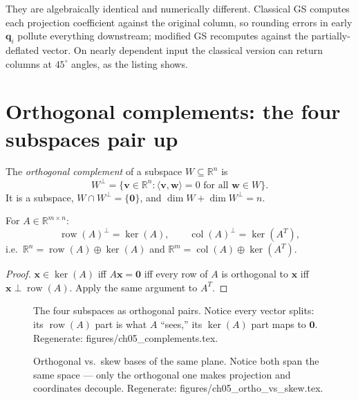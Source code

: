 \begin{tripwire}
They are algebraically identical and numerically different. Classical GS
computes each projection coefficient against the original column, so
rounding errors in early $\mathbf q_i$ pollute everything downstream;
modified GS recomputes against the partially-deflated vector. On nearly
dependent input the classical version can return columns at $45^\circ$
angles, as the listing shows.
\end{tripwire}

\section{Orthogonal complements: the four subspaces pair up}\label{sec:orth-complements}

\begin{definition}
The \emph{orthogonal complement} of a subspace $W\subseteq\mathbb R^n$ is
\[
W^\perp=\{\mathbf v\in\mathbb R^n:\langle\mathbf v,\mathbf w\rangle=0
\text{ for all }\mathbf w\in W\}.
\]
It is a subspace, $W\cap W^\perp=\{\mathbf0\}$, and
$\dim W+\dim W^\perp=n$.
\end{definition}

\begin{theorem}\label{th:fund-orth}
For $A\in\mathbb R^{m\times n}$:
\[
\operatorname{row}(A)^{\perp}=\ker(A),\qquad
\operatorname{col}(A)^{\perp}=\ker(A^{T}),
\]
i.e.\ $\mathbb R^n=\operatorname{row}(A)\oplus\ker(A)$ and
$\mathbb R^m=\operatorname{col}(A)\oplus\ker(A^{T})$.
\end{theorem}

\begin{proof}
$\mathbf x\in\ker(A)$ iff $A\mathbf x=\mathbf0$ iff every row of $A$ is
orthogonal to $\mathbf x$ iff $\mathbf x\perp\operatorname{row}(A)$. Apply the
same argument to $A^{T}$.
\end{proof}

\begin{figure}[htbp]
\centering

\caption{The four subspaces as orthogonal pairs. Notice every vector
splits: its $\operatorname{row}(A)$ part is what $A$ ``sees,'' its
$\ker(A)$ part maps to $\mathbf0$. Regenerate:
\ttfamily figures/ch05\_complements.tex.}
\label{fig:complements}
\end{figure}

\begin{figure}[htbp]
\centering

\caption{Orthogonal vs.\ skew bases of the same plane. Notice both span
the same space --- only the orthogonal one makes projection and
coordinates decouple. Regenerate: \ttfamily figures/ch05\_ortho\_vs\_skew.tex.}
\label{fig:ortho-vs-skew}
\end{figure}

